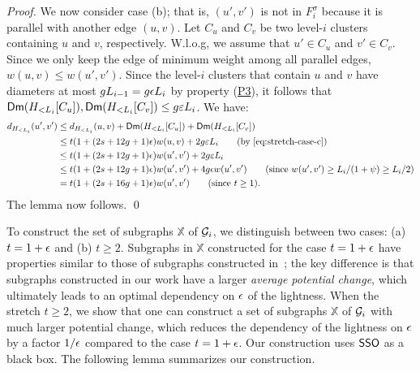 \begin{proof}
	We now consider case (b); that is, $(u',v')$  is not in $F^{\sigma}_i $ because  it is parallel with another edge $(u,v)$. 	Let $C_u$ and $C_v$ be two level-$i$ clusters containing $u$ and $v$, respectively. W.l.o.g, we assume that $u' \in C_u$  and $v' \in C_v$. Since we only keep the edge of minimum weight among all parallel edges, $w(u,v) \leq w(u',v')$. Since the level-$i$ clusters that contain $u$  and $v$ have diameters at most $gL_{i-1} = g\epsilon L_i$ by property (\hyperlink{P3}{P3}), it follows that $\mathsf{Dm}(H_{<L_i}[C_u]),\mathsf{Dm}(H_{<L_i}[C_v]) \le g\varepsilon L_i$. 	We have:
	\begin{equation*}
		\begin{split}
			d_{H_{<L_i}}(u',v') &\leq 	d_{H_{<L_i}}(u,v) + \dm(H_{<L_i}[C_u]) + \dm(H_{<L_i}[C_v])\\ &\leq t(1+(2s+12g+1)\eps)w(u,v) +   2g\epsi L_i \qquad \mbox{(by \Cref{eq:stretch-case-c})}\\
			&\leq  t(1+(2s+12g+1)\eps) w(u',v')  +  2g\epsi L_i\\
			&\leq t(1+(2s+12g+1)\eps) w(u',v') + 4g\eps w(u',v') \qquad \mbox{(since $w(u',v') \geq L_i/(1+\psi) \geq L_i/2$)}\\
			&= t(1+(2s+16g+1)\eps) w(u',v') \qquad \mbox{(since $t\geq 1$)}.
		\end{split}
	\end{equation*}
	The lemma now follows. 
	\qed
\end{proof}

To construct the set of subgraphs $\mathbb{X}$ of $\mathcal{G}_i$, we distinguish between two cases: (a) $t = 1+\epsilon$ and (b) $t\geq 2$. Subgraphs in $\mathbb{X}$ constructed for the case $t=1+\epsilon$ have properties similar to those of subgraphs constructed in~\cite{LS21}; the key difference is that subgraphs constructed in our work have a larger \emph{average potential change}, which ultimately leads to an optimal dependency on $\epsilon$ of the lightness. When the stretch $t\geq 2$, we show that one can construct a set of subgraphs $\mathbb{X}$ of $\mathcal{G}_i$ with much larger potential change, which reduces the dependency of the lightness on $\epsilon$  by a factor $1/\epsilon$ compared to the case $t = 1+\epsilon$. Our construction uses \hyperlink{SPHigh}{$\mathsf{SSO}$} as a black box. The following lemma summarizes our construction. 


